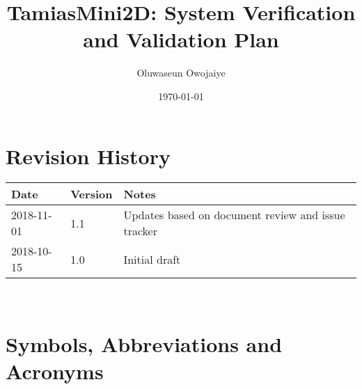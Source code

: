 \documentclass[12pt, titlepage]{article}
\begin{document}
\title{TamiasMini2D: System Verification and Validation Plan} 
\author{Oluwaseun Owojaiye}
\date{\today}
	
\maketitle


\section{Revision History}

\begin{tabularx}{\textwidth}{p{3cm}p{2cm}X}
\toprule {\bf Date} & {\bf Version} & {\bf Notes}\\
\midrule
2018-11-01 & 1.1 & Updates based on document review and issue tracker\\
2018-10-15 & 1.0 & Initial draft\\
\bottomrule
\end{tabularx}

~\newpage

\section{Symbols, Abbreviations and Acronyms}
\renewcommand{\arraystretch}{1.2}
\end{document}
